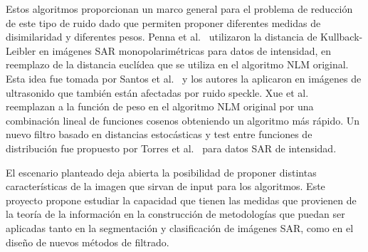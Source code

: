 \documentclass[11pt]{article}
\begin{document}
Estos algoritmos proporcionan un marco general para el problema de reducción de este tipo de ruido dado que permiten proponer diferentes medidas de disimilaridad y diferentes pesos. 
Penna et al.~\cite{Penna2013} utilizaron la distancia de Kullback-Leibler en imágenes SAR monopolarimétricas para datos de intensidad, en reemplazo de la distancia euclídea que se utiliza en el algoritmo NLM original. 
Esta idea fue tomada por Santos et al.~\cite{Santos2017} y los autores la aplicaron en imágenes de ultrasonido que también están afectadas por ruido speckle. 
Xue et al.~\cite{Xue2013} reemplazan a la función de peso en el algoritmo NLM original por una combinación lineal de funciones cosenos obteniendo un algoritmo más rápido. 
Un nuevo filtro basado en distancias estocásticas y test entre funciones de distribución fue propuesto por Torres et al.~\cite{Torres2012} para datos SAR de intensidad.

El escenario planteado deja abierta la posibilidad de proponer distintas características de la imagen que sirvan de input para los algoritmos. Este proyecto propone estudiar la capacidad que tienen las medidas que provienen de la teoría de la información en la construcción de metodologías que puedan ser aplicadas tanto en la segmentación y clasificación de imágenes SAR, como en el diseño de nuevos métodos de filtrado.


%
\end{document}

